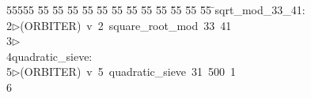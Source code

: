 %
%
\begin{tabbing}
55555 \= 55 \= 55 \= 55 \= 55 \= 55 \= 55 \= 55 \= 55 \= 55 \= 55 \= 55 \= 55 \= \>sqrt\_mod\_33\_41:\\[0pt]
2\>$\triangleright$\>(ORBITER)\ v\ 2\ square\_root\_mod\ 33\ 41\\[0pt]
3\>$\triangleright$\>\\[0pt]
4\>quadratic\_sieve:\\[0pt]
5\>$\triangleright$\>(ORBITER)\ v\ 5\ quadratic\_sieve\ 31\ 500\ 1\\[0pt]
6\>\end{tabbing}
